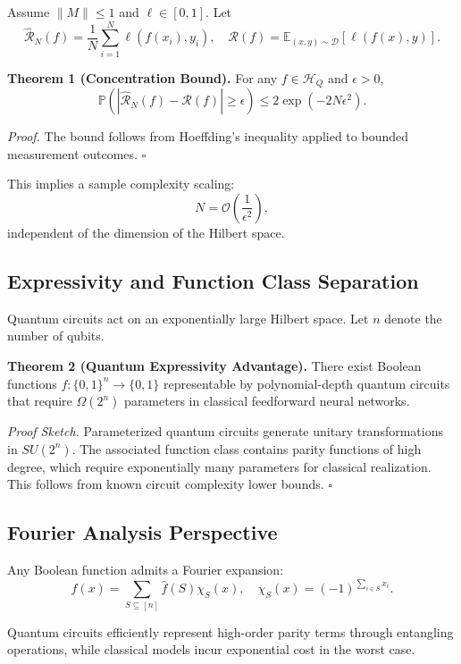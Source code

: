 \documentclass[11pt,a4paper]{article}
\begin{document}
Assume $\|M\|\leq 1$ and $\ell \in [0,1]$. Let
\[
\hat{\mathcal{R}}_N(f)
=
\frac{1}{N}\sum_{i=1}^N \ell(f(x_i), y_i),
\quad
\mathcal{R}(f)
=
\mathbb{E}_{(x,y)\sim\mathcal{D}}[\ell(f(x),y)].
\]

\textbf{Theorem 1 (Concentration Bound).}
For any $f \in \mathcal{H}_Q$ and $\epsilon > 0$,
\[
\mathbb{P}\left(
\left|
\hat{\mathcal{R}}_N(f) - \mathcal{R}(f)
\right| \geq \epsilon
\right)
\leq 2\exp(-2N\epsilon^2).
\]

\textit{Proof.}
The bound follows from Hoeffding's inequality applied to bounded measurement
outcomes. \hfill $\square$

This implies a sample complexity scaling:
\[
N = \mathcal{O}\left(\frac{1}{\epsilon^2}\right),
\]
independent of the dimension of the Hilbert space.

\subsection{Expressivity and Function Class Separation}

Quantum circuits act on an exponentially large Hilbert space.
Let $n$ denote the number of qubits.

\textbf{Theorem 2 (Quantum Expressivity Advantage).}
There exist Boolean functions
$f:\{0,1\}^n \rightarrow \{0,1\}$ representable by polynomial-depth quantum
circuits that require $\Omega(2^n)$ parameters in classical feedforward neural
networks.

\textit{Proof Sketch.}
Parameterized quantum circuits generate unitary transformations in
$SU(2^n)$. The associated function class contains parity functions of high
degree, which require exponentially many parameters for classical realization.
This follows from known circuit complexity lower bounds. \hfill $\square$

\subsection{Fourier Analysis Perspective}

Any Boolean function admits a Fourier expansion:
\[
f(x) = \sum_{S \subseteq [n]} \hat{f}(S) \chi_S(x),
\quad
\chi_S(x) = (-1)^{\sum_{i \in S} x_i}.
\]

Quantum circuits efficiently represent high-order parity terms through
entangling operations, while classical models incur exponential cost in the
worst case.
\end{document}
